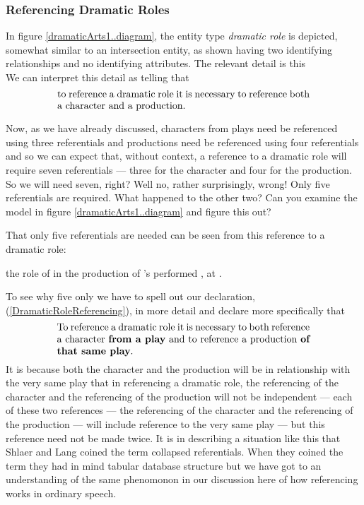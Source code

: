  \subsubsection{Referencing Dramatic Roles}
\mynote
In figure \ref{dramaticArts1..diagram}, the entity type \textit{dramatic role} is
depicted, somewhat similar to an intersection entity, as shown having
two identifying relationships and no identifying attributes.
The relevant detail is  this
\begin{equation*}

\end{equation*}
We can interpret this detail as telling that
\begin{equation}
\label{DramaticRoleReferencing}
\text{\parbox{9cm}{to reference a dramatic role it is necessary  
to reference both a character and  a production.}}
\end{equation}

Now, as we have already discussed, characters from plays need be referenced using three referentials
and productions need be referenced using four referentials 
and so we can expect that, without context, a reference to
a dramatic role will require seven referentials
 --- three for the character and four for the production. 
So we will need seven, right?
 Well no, rather surprisingly, wrong! Only five referentials are required. 
 What happened to the other two? Can you examine the model in figure \ref{dramaticArts1..diagram} and figure this out?

That only five referentials are needed can be seen from this reference to a dramatic role:
\begin{erquote}
\parbox{9.0cm}{the role of  in the production of \mbox{'s}  performed \mbox{,} at .
}
\end{erquote}

To see why five only we have to spell out our declaration, (\ref{DramaticRoleReferencing}), in more detail
and declare more specifically that
\begin{equation}
\label{DramaticRoleReferencingRevised}
\text{\parbox{9cm}{To reference a dramatic role it is necessary 
to both reference a character \textbf{from a play} and to reference a production \textbf{of that same play}.}}
\end{equation}
It is because both the character and the production will be in relationship with the very same play
that in referencing a dramatic role, the referencing of the character and the referencing of
the production will not be independent
--- each of these two references --- the referencing of the character and the referencing of the production ---
 will include reference to the very same play --- but this reference need not be made twice. 
It is in describing a situation like this that Shlaer and Lang coined the term collapsed referentials. 
 When they coined the term they had in mind tabular database structure 
 but we have got to an understanding of the same phenomonon in our discussion here 
 of how referencing works in ordinary speech. 

